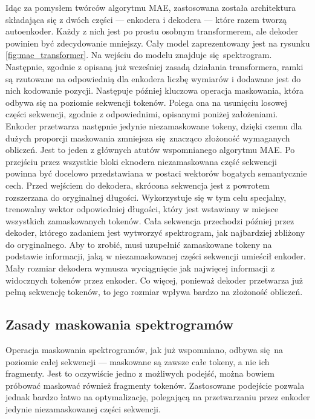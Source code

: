 Idąc za pomysłem twórców algorytmu MAE, zastosowana została architektura składająca się z dwóch
części --- enkodera i dekodera --- które razem tworzą autoenkoder. Każdy z nich jest po prostu
osobnym transformerem, ale dekoder powinien być zdecydowanie mniejszy. Cały model zaprezentowany
jest na rysunku \ref{fig:mae_transformer}. Na wejściu do modelu znajduje się spektrogram. Następnie,
zgodnie z opisaną już wcześniej zasadą działania transformera, ramki są rzutowane na odpowiednią dla
enkodera liczbę wymiarów i dodawane jest do nich kodowanie pozycji. Następuje później kluczowa
operacja maskowania, która odbywa się na poziomie sekwencji tokenów. Polega ona na usunięciu losowej
części sekwencji, zgodnie z odpowiednimi, opisanymi poniżej założeniami. Enkoder przetwarza
następnie jedynie niezamaskowane tokeny, dzięki czemu dla dużych proporcji maskowania zmniejsza
się znacząco złożoność wymaganych obliczeń. Jest to jeden z głównych atutów wspomnianego algorytmu
MAE. Po przejściu przez wszystkie bloki eknodera niezamaskowana część sekwencji powinna być
docelowo przedstawiana w postaci wektorów bogatych semantycznie cech. Przed wejściem do dekodera,
skrócona sekwencja jest z powrotem rozszerzana do oryginalnej długości. Wykorzystuje się w tym celu
specjalny, trenowalny wektor odpowiedniej długości, który jest wstawiany w miejsce wszystkich
zamaskowanych tokenów. Cała sekwencja przechodzi później przez dekoder, którego zadaniem jest
wytworzyć spektrogram, jak najbardziej zbliżony do oryginalnego. Aby to zrobić, musi uzupełnić
zamaskowane tokeny na podstawie informacji, jaką w niezamaskowanej części sekwencji umieścił
enkoder. Mały rozmiar dekodera wymusza wyciągnięcie jak najwięcej informacji z widocznych tokenów
przez enkoder. Co więcej, ponieważ dekoder przetwarza już pełną sekwencję tokenów, to jego rozmiar
wpływa bardzo na złożoność obliczeń.

\subsection{Zasady maskowania spektrogramów}

Operacja maskowania spektrogramów, jak już wspomniano, odbywa się na poziomie całej sekwencji ---
maskowane są zawsze całe tokeny, a nie ich fragmenty. Jest to oczywiście jedno z możliwych podejść,
można bowiem próbować maskować również fragmenty tokenów. Zastosowane podejście pozwala jednak
bardzo łatwo na optymalizację, polegającą na przetwarzaniu przez enkoder jedynie niezamaskowanej
części sekwencji.


